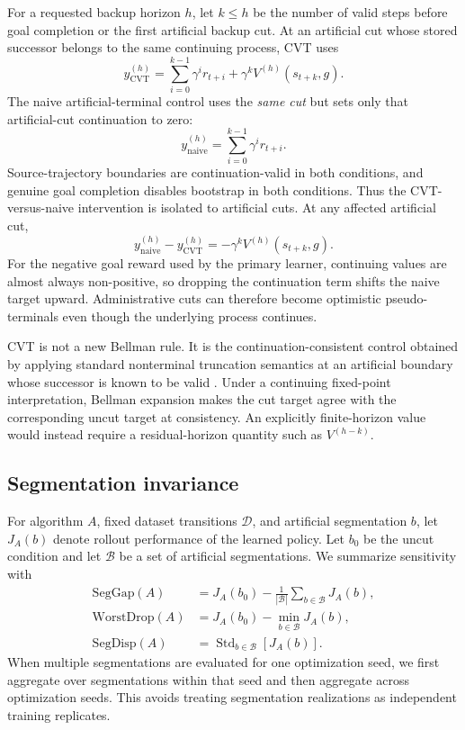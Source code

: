 For a requested backup horizon $h$, let $k\leq h$ be the number of valid steps before goal completion or the first artificial backup cut. At an artificial cut whose stored successor belongs to the same continuing process, CVT uses
\begin{equation}
  y_{\mathrm{CVT}}^{(h)}
  =
  \sum_{i=0}^{k-1}\gamma^i r_{t+i}
  + \gamma^k V^{(h)}(s_{t+k},g).
\end{equation}
The naive artificial-terminal control uses the \emph{same cut} but sets only that artificial-cut continuation to zero:
\begin{equation}
  y_{\mathrm{naive}}^{(h)}
  =
  \sum_{i=0}^{k-1}\gamma^i r_{t+i}.
\end{equation}
Source-trajectory boundaries are continuation-valid in both conditions, and genuine goal completion disables bootstrap in both conditions. Thus the CVT-versus-naive intervention is isolated to artificial cuts. At any affected artificial cut,
\begin{equation}
  y_{\mathrm{naive}}^{(h)}-y_{\mathrm{CVT}}^{(h)}
  =-\gamma^k V^{(h)}(s_{t+k},g).
\end{equation}
For the negative goal reward used by the primary learner, continuing values are almost always non-positive, so dropping the continuation term shifts the naive target upward. Administrative cuts can therefore become optimistic pseudo-terminals even though the underlying process continues.

CVT is not a new Bellman rule. It is the continuation-consistent control obtained by applying standard nonterminal truncation semantics at an artificial boundary whose successor is known to be valid \cite{pardo2018timelimits}. Under a continuing fixed-point interpretation, Bellman expansion makes the cut target agree with the corresponding uncut target at consistency. An explicitly finite-horizon value would instead require a residual-horizon quantity such as $V^{(h-k)}$.

\subsection{Segmentation invariance}

For algorithm $A$, fixed dataset transitions $\mathcal{D}$, and artificial segmentation $b$, let $J_A(b)$ denote rollout performance of the learned policy. Let $b_0$ be the uncut condition and let $\mathcal{B}$ be a set of artificial segmentations. We summarize sensitivity with
\begin{align}
  \mathrm{SegGap}(A)
  &=J_A(b_0)-\frac{1}{|\mathcal{B}|}\sum_{b\in\mathcal{B}}J_A(b),\\
  \mathrm{WorstDrop}(A)
  &=J_A(b_0)-\min_{b\in\mathcal{B}}J_A(b),\\
  \mathrm{SegDisp}(A)
  &=\operatorname{Std}_{b\in\mathcal{B}}\left[J_A(b)\right].
\end{align}
When multiple segmentations are evaluated for one optimization seed, we first aggregate over segmentations within that seed and then aggregate across optimization seeds. This avoids treating segmentation realizations as independent training replicates.

